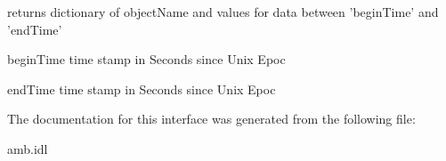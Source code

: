 returns dictionary of object\-Name and values for data between 'begin\-Time' and 'end\-Time' 

\begin{DoxyItemize}
\item begin\-Time time stamp in Seconds since Unix Epoc \item end\-Time time stamp in Seconds since Unix Epoc \end{DoxyItemize}


The documentation for this interface was generated from the following file\-:\begin{DoxyCompactItemize}
\item 
amb.\-idl\end{DoxyCompactItemize}
